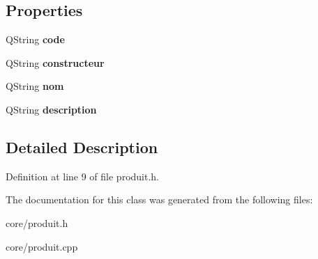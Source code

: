 \subsection*{Properties}
\begin{DoxyCompactItemize}
\item 
\hypertarget{class_produit_a292f9a5ad8f468674fb71500f4eb2e03}{
QString {\bfseries code}}
\label{class_produit_a292f9a5ad8f468674fb71500f4eb2e03}

\item 
\hypertarget{class_produit_a6fc171a927753852c8b50590ca63eb35}{
QString {\bfseries constructeur}}
\label{class_produit_a6fc171a927753852c8b50590ca63eb35}

\item 
\hypertarget{class_produit_a582becfbc8aef72c99f83a37642cf7a5}{
QString {\bfseries nom}}
\label{class_produit_a582becfbc8aef72c99f83a37642cf7a5}

\item 
\hypertarget{class_produit_af13c24a4fbce61179abd1860dd5e7857}{
QString {\bfseries description}}
\label{class_produit_af13c24a4fbce61179abd1860dd5e7857}

\end{DoxyCompactItemize}


\subsection{Detailed Description}


Definition at line 9 of file produit.h.



The documentation for this class was generated from the following files:\begin{DoxyCompactItemize}
\item 
core/produit.h\item 
core/produit.cpp\end{DoxyCompactItemize}
